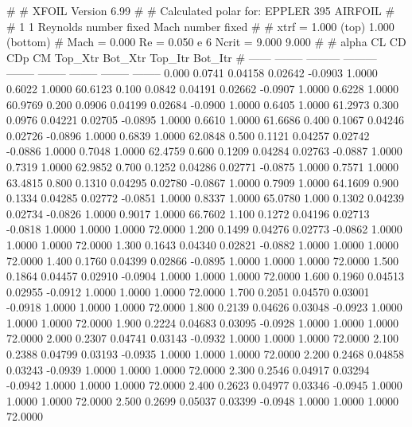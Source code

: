 #  
#       XFOIL         Version 6.99
#  
# Calculated polar for: EPPLER 395 AIRFOIL                              
#  
# 1 1 Reynolds number fixed          Mach number fixed         
#  
# xtrf =   1.000 (top)        1.000 (bottom)  
# Mach =   0.000     Re =     0.050 e 6     Ncrit =   9.000  9.000
#  
#   alpha    CL        CD       CDp       CM     Top_Xtr  Bot_Xtr  Top_Itr  Bot_Itr
#  ------ -------- --------- --------- -------- -------- -------- -------- --------
   0.000   0.0741   0.04158   0.02642  -0.0903   1.0000   0.6022   1.0000  60.6123
   0.100   0.0842   0.04191   0.02662  -0.0907   1.0000   0.6228   1.0000  60.9769
   0.200   0.0906   0.04199   0.02684  -0.0900   1.0000   0.6405   1.0000  61.2973
   0.300   0.0976   0.04221   0.02705  -0.0895   1.0000   0.6610   1.0000  61.6686
   0.400   0.1067   0.04246   0.02726  -0.0896   1.0000   0.6839   1.0000  62.0848
   0.500   0.1121   0.04257   0.02742  -0.0886   1.0000   0.7048   1.0000  62.4759
   0.600   0.1209   0.04284   0.02763  -0.0887   1.0000   0.7319   1.0000  62.9852
   0.700   0.1252   0.04286   0.02771  -0.0875   1.0000   0.7571   1.0000  63.4815
   0.800   0.1310   0.04295   0.02780  -0.0867   1.0000   0.7909   1.0000  64.1609
   0.900   0.1334   0.04285   0.02772  -0.0851   1.0000   0.8337   1.0000  65.0780
   1.000   0.1302   0.04239   0.02734  -0.0826   1.0000   0.9017   1.0000  66.7602
   1.100   0.1272   0.04196   0.02713  -0.0818   1.0000   1.0000   1.0000  72.0000
   1.200   0.1499   0.04276   0.02773  -0.0862   1.0000   1.0000   1.0000  72.0000
   1.300   0.1643   0.04340   0.02821  -0.0882   1.0000   1.0000   1.0000  72.0000
   1.400   0.1760   0.04399   0.02866  -0.0895   1.0000   1.0000   1.0000  72.0000
   1.500   0.1864   0.04457   0.02910  -0.0904   1.0000   1.0000   1.0000  72.0000
   1.600   0.1960   0.04513   0.02955  -0.0912   1.0000   1.0000   1.0000  72.0000
   1.700   0.2051   0.04570   0.03001  -0.0918   1.0000   1.0000   1.0000  72.0000
   1.800   0.2139   0.04626   0.03048  -0.0923   1.0000   1.0000   1.0000  72.0000
   1.900   0.2224   0.04683   0.03095  -0.0928   1.0000   1.0000   1.0000  72.0000
   2.000   0.2307   0.04741   0.03143  -0.0932   1.0000   1.0000   1.0000  72.0000
   2.100   0.2388   0.04799   0.03193  -0.0935   1.0000   1.0000   1.0000  72.0000
   2.200   0.2468   0.04858   0.03243  -0.0939   1.0000   1.0000   1.0000  72.0000
   2.300   0.2546   0.04917   0.03294  -0.0942   1.0000   1.0000   1.0000  72.0000
   2.400   0.2623   0.04977   0.03346  -0.0945   1.0000   1.0000   1.0000  72.0000
   2.500   0.2699   0.05037   0.03399  -0.0948   1.0000   1.0000   1.0000  72.0000
